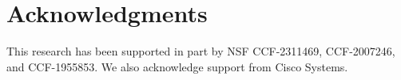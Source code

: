 \section{Acknowledgments}
\label{sec:acknowledgments}

This research has been supported in part by NSF CCF-2311469, CCF-2007246, and CCF-1955853. We also acknowledge support from Cisco Systems. %